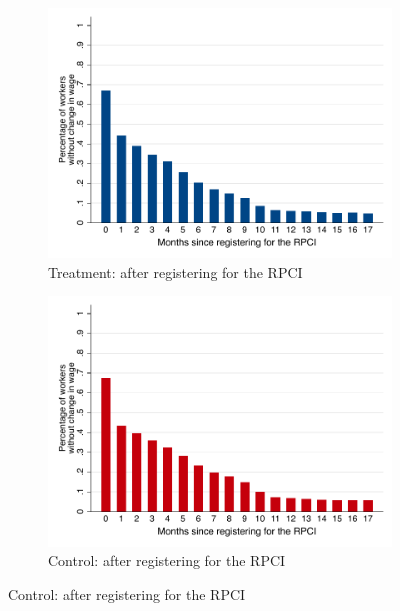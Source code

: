 \documentclass[oneside,11pt]{article}
\begin{document}
\begin{figure}[H]
    \caption{Percentage of workers having the same wage after the RPCI - Matched data}
    \label{hist_wage_time_since_treated_matched}
    \begin{center}
    
    \begin{subfigure}{0.49\textwidth}
    \caption{Treatment: after registering for the RPCI}
    \includegraphics[width=\textwidth]{04_Figures/muestra_1porciento/hist_wage_time_since_treated_treat.pdf}
    \end{subfigure}
    \begin{subfigure}{0.49\textwidth}
    \caption{Control: after registering for the RPCI}
    \includegraphics[width=\textwidth]{04_Figures/muestra_1porciento/hist_wage_time_since_treated_control_matched.pdf}
    \end{subfigure}
    

\end{center}
\end{figure}
\end{document}
